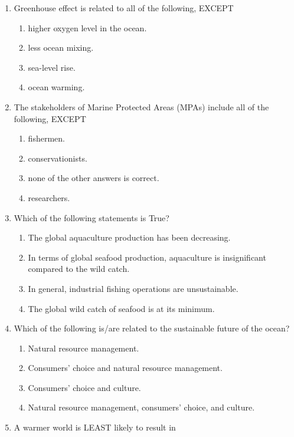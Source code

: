 \documentclass{report}
\begin{document}
\begin{enumerate}
\begin{enumerate}
    \end{enumerate}
    \item Greenhouse effect is related to all of the following, EXCEPT
    \begin{enumerate}
        \item   higher oxygen level in the ocean. 
        \item   less ocean mixing. 
        \item   sea-level rise. 
        \item   ocean warming. 
    \end{enumerate}
    \item The stakeholders of Marine Protected Areas (MPAs) include all of the following, EXCEPT
    \begin{enumerate}
        \item   fishermen. 
        \item   conservationists. 
        \item   none of the other answers is correct. 
        \item   researchers. 
    \end{enumerate}
    \item Which of the following statements is True?
    \begin{enumerate}
        \item   The global aquaculture production has been decreasing. 
        \item   In terms of global seafood production, aquaculture is insignificant compared to the wild catch.
        \item   In general, industrial fishing operations are unsustainable. 
        \item   The global wild catch of seafood is at its minimum. 
    \end{enumerate}
    \item Which of the following is/are related to the sustainable future of the ocean?
    \begin{enumerate}
        \item   Natural resource management. 
        \item   Consumers’ choice and natural resource management. 
        \item   Consumers’ choice and culture. 
        \item   Natural resource management, consumers’ choice, and culture. 
    \end{enumerate}
    \item A warmer world is LEAST likely to result in

\end{enumerate}
\end{document}
